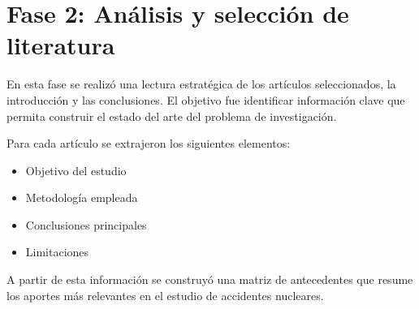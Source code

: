\onecolumn

\section{Fase 2: Análisis y selección de literatura}

En esta fase se realizó una lectura estratégica de los artículos seleccionados, la introducción y las conclusiones. El objetivo fue identificar información clave que permita construir el estado del arte del problema de investigación.

Para cada artículo se extrajeron los siguientes elementos:
\begin{itemize}
    \item Objetivo del estudio
    \item Metodología empleada
    \item Conclusiones principales
    \item Limitaciones
\end{itemize}

A partir de esta información se construyó una matriz de antecedentes que resume los aportes más relevantes en el estudio de accidentes nucleares.

